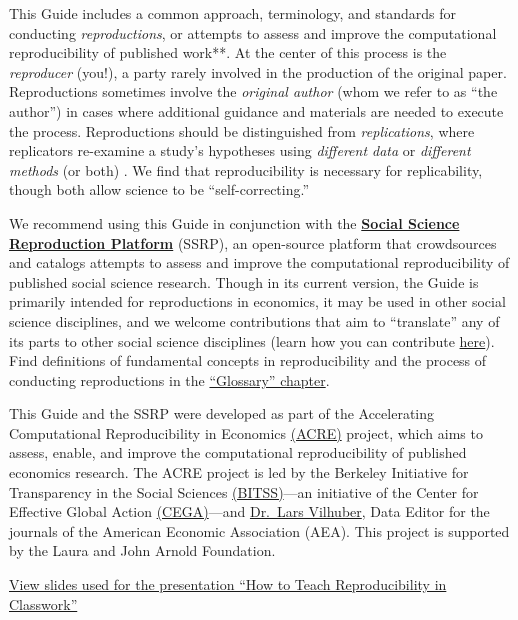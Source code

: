 \documentclass[
]{book}
\begin{document}
This Guide includes a common approach, terminology, and standards for conducting \emph{reproductions}, or attempts to assess and improve the computational reproducibility of published work**. At the center of this process is the \emph{reproducer} (you!), a party rarely involved in the production of the original paper. Reproductions sometimes involve the \emph{original author} (whom we refer to as ``the author'') in cases where additional guidance and materials are needed to execute the process. Reproductions should be distinguished from \emph{replications}, where replicators re-examine a study's hypotheses using \emph{different data} or \emph{different methods} (or both) \citep{King95}. We find that reproducibility is necessary for replicability, though both allow science to be ``self-correcting.''

We recommend using this Guide in conjunction with the \href{https://www.socialsciencereproduction.org/}{\textbf{Social Science Reproduction Platform}} (SSRP), an open-source platform that crowdsources and catalogs attempts to assess and improve the computational reproducibility of published social science research. Though in its current version, the Guide is primarily intended for reproductions in economics, it may be used in other social science disciplines, and we welcome contributions that aim to ``translate'' any of its parts to other social science disciplines (learn how you can contribute \href{https://bitss.github.io/ACRE/contributions.html}{here}). Find definitions of fundamental concepts in reproducibility and the process of conducting reproductions in the \href{https://bitss.github.io/ACRE/definitions.html}{``Glossary'' chapter}.

This Guide and the SSRP were developed as part of the Accelerating Computational Reproducibility in Economics \href{https://www.bitss.org/ecosystem/acre/}{(ACRE)} project, which aims to assess, enable, and improve the computational reproducibility of published economics research. The ACRE project is led by the Berkeley Initiative for Transparency in the Social Sciences \href{https://bitss.org}{(BITSS)}---an initiative of the Center for Effective Global Action \href{https://cega.berkeley.edu/}{(CEGA)}---and \href{https://www.vilhuber.com/lars/}{Dr.~Lars Vilhuber}, Data Editor for the journals of the American Economic Association (AEA). This project is supported by the Laura and John Arnold Foundation.

\href{https://bitss.github.io/WEAI2020_slides/}{View slides used for the presentation ``How to Teach Reproducibility in Classwork''}
\end{document}
